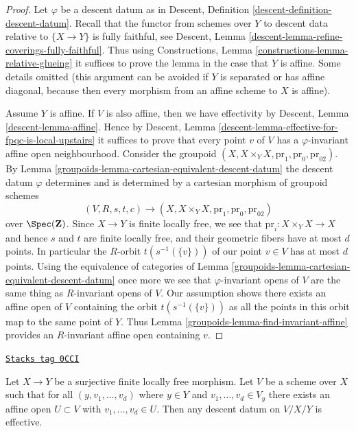 \begin{proof}

Let $\varphi$ be a descent datum as in
Descent, Definition \ref{descent-definition-descent-datum}.
Recall that the functor from schemes over $Y$ to descent data
relative to $\{X \to Y\}$ is fully faithful, see
Descent, Lemma \ref{descent-lemma-refine-coverings-fully-faithful}.
Thus using Constructions, Lemma \ref{constructions-lemma-relative-glueing}
it suffices to prove the lemma in the case that $Y$ is affine.
Some details omitted (this argument can be avoided if $Y$ is
separated or has affine diagonal, because then every morphism from
an affine scheme to $X$ is affine).

\medskip\noindent
Assume $Y$ is affine. If $V$ is also affine, then we have effectivity by
Descent, Lemma \ref{descent-lemma-affine}. Hence by
Descent, Lemma \ref{descent-lemma-effective-for-fpqc-is-local-upstairs}
it suffices to prove that every point $v$ of $V$ has a $\varphi$-invariant
affine open neighbourhood. Consider the groupoid
$(X, X \times_Y X, \text{pr}_1, \text{pr}_0, \text{pr}_{02})$.
By Lemma \ref{groupoids-lemma-cartesian-equivalent-descent-datum}
the descent datum $\varphi$ determines and is determined by
a cartesian morphism of groupoid schemes
$$
(V, R, s, t, c)
\longrightarrow
(X, X \times_Y X, \text{pr}_1, \text{pr}_0, \text{pr}_{02})
$$
over $\Spec(\mathbf{Z})$.
Since $X \to Y$ is finite locally free, we see that
$\text{pr}_i : X \times_Y X \to X$ and hence $s$ and $t$
are finite locally free, and their geometric fibers have at most $d$
points. In particular the $R$-orbit $t(s^{-1}(\{v\}))$ of our point
$v \in V$ has at most $d$ points. Using the equivalence of categories of
Lemma \ref{groupoids-lemma-cartesian-equivalent-descent-datum}
once more we see that $\varphi$-invariant opens of $V$
are the same thing as $R$-invariant opens of $V$.
Our assumption shows there exists an affine open of $V$
containing the orbit $t(s^{-1}(\{v\}))$ as all the points
in this orbit map to the same point of $Y$.
Thus Lemma \ref{groupoids-lemma-find-invariant-affine}
provides an $R$-invariant affine open containing $v$.
\end{proof}

\begin{lemma}
\label{groupoids-lemma-descend-along-finite}
\href{https://stacks.math.columbia.edu/tag/0CCI}{\texttt{Stacks tag 0CCI}}

Let $X \to Y$ be a surjective finite locally free morphism.
Let $V$ be a scheme over $X$ such that for all
$(y, v_1, \ldots, v_d)$ where $y \in Y$ and
$v_1, \ldots, v_d \in V_y$ there exists an affine open
$U \subset V$ with $v_1, \ldots, v_d \in U$.
Then any descent datum on $V/X/Y$ is effective.
\end{lemma}


